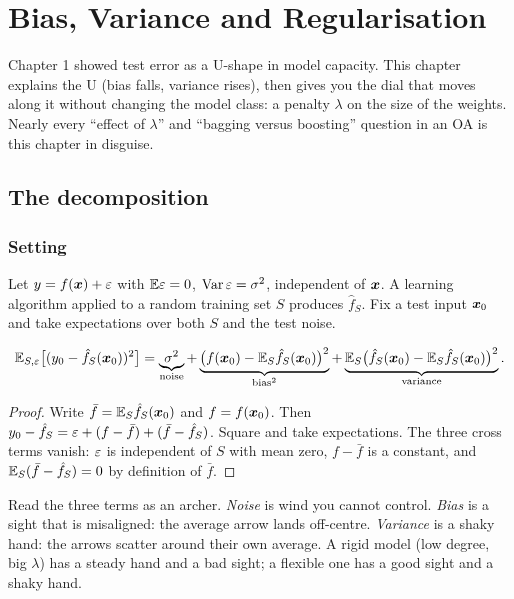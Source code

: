 \chapter{Bias, Variance and Regularisation}
\label{ch:biasvar}
Chapter 1 showed test error as a U-shape in model capacity. This chapter explains the U
(bias falls, variance rises), then gives you the dial that moves along it without changing the model
class: a penalty $\lambda$ on the size of the weights. Nearly every ``effect of $\lambda$'' and
``bagging versus boosting'' question in an OA is this chapter in disguise.

\section{The decomposition}

\subsection{Setting}
Let $y=f({\bm{x}})+\varepsilon$ with $\mathbb{E}\varepsilon=0$, $\operatorname{Var}\varepsilon=\sigma^2$, independent of ${\bm{x}}$. A learning algorithm
applied to a random training set $S$ produces $\hat f_S$. Fix a test input ${\bm{x}}_0$ and take
expectations over both $S$ and the test noise.

\begin{theorem}
	\[ \mathbb{E}_{S,\varepsilon}\bigl[(y_0-\hat f_S({\bm{x}}_0))^2\bigr]
		=\underbrace{\sigma^2}_{\text{noise}}
		+\underbrace{\bigl(f({\bm{x}}_0)-\mathbb{E}_S\hat f_S({\bm{x}}_0)\bigr)^2}_{\text{bias}^2}
		+\underbrace{\mathbb{E}_S\bigl(\hat f_S({\bm{x}}_0)-\mathbb{E}_S\hat f_S({\bm{x}}_0)\bigr)^2}_{\text{variance}}. \]
\end{theorem}
\begin{proof}
	Write $\bar f=\mathbb{E}_S\hat f_S({\bm{x}}_0)$ and $f=f({\bm{x}}_0)$. Then
	$y_0-\hat f_S=\varepsilon+(f-\bar f)+(\bar f-\hat f_S)$. Square and take expectations. The three cross
	terms vanish: $\varepsilon$ is independent of $S$ with mean zero, $f-\bar f$ is a constant, and
	$\mathbb{E}_S(\bar f-\hat f_S)=0$ by definition of $\bar f$.
\end{proof}

Read the three terms as an archer. \emph{Noise} is wind you cannot control. \emph{Bias} is a
sight that is misaligned: the average arrow lands off-centre. \emph{Variance} is a shaky hand: the
arrows scatter around their own average. A rigid model (low degree, big $\lambda$) has a steady hand
and a bad sight; a flexible one has a good sight and a shaky hand.

